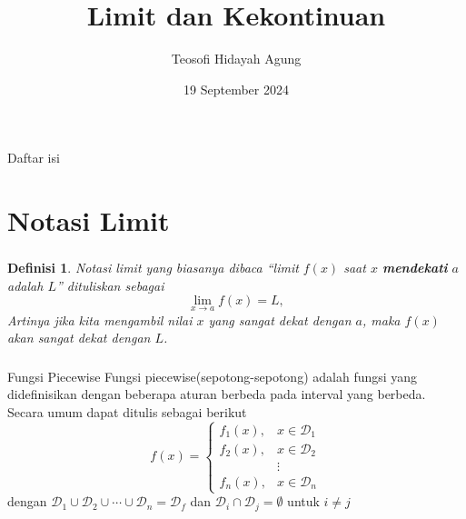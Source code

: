 \documentclass[aspectratio=169]{beamer}
\author[Tetew]{Teosofi Hidayah Agung}
\date{19 September 2024}
\title[Kalkulus 1 - Bab 3]{Limit dan Kekontinuan}
\institute[Matematika ITS]{Departemen Matematika\\ Institut Teknologi Sepuluh Nopember}
\newtheorem{definisi}{Definisi}
\theoremstyle{definition}
\newcommand{\dom}{\mathcal{D}}
\begin{document}
{
\begin{frame}
    \titlepage
\end{frame}
}

\begin{frame}{Daftar isi}
    \tableofcontents[currentsection]
\end{frame}

\section{Notasi Limit}
\begin{frame}
    \frametitle{\insertsection}
    \begin{definisi}
        Notasi limit yang biasanya dibaca ``limit $f(x)$ saat $x$ \textbf{mendekati} $a$ adalah $L$'' dituliskan sebagai
        \[\lim_{x\to a} f(x)=L,\]
        Artinya jika kita mengambil nilai $x$ yang sangat dekat dengan $a$, maka $f(x)$ akan sangat dekat dengan $L$.
    \end{definisi}
\end{frame}

\begin{frame}
    \frametitle{\insertsection}
    \begin{block}{Fungsi Piecewise}
        Fungsi piecewise(sepotong-sepotong) adalah fungsi yang didefinisikan dengan beberapa aturan berbeda pada interval yang berbeda. Secara umum dapat ditulis sebagai berikut
        \begin{equation*}
            f(x)=\begin{cases}
                f_1(x), & x\in \dom_1 \\
                f_2(x), & x\in \dom_2 \\
                        & \vdots      \\
                f_n(x), & x\in \dom_n
            \end{cases}
        \end{equation*}
        dengan $\dom_1\cup\dom_2\cup\cdots\cup\dom_n=\dom_f$ dan $\dom_i\cap\dom_j=\emptyset$ untuk $i\neq j$
    \end{block}
\end{frame}
\end{document}
